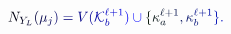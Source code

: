 \documentclass[12pt]{article}
\begin{document}
\makeatletter
\renewcommand*{\@textcolor}[3]{%
  \protect\leavevmode
  \begingroup
    \color#1{#2}#3%
  \endgroup
}
\makeatother
\begin{displaymath}
\mathcolor[RGB]{0,0,15}{N} _ { \mathcolor[RGB]{0,0,30}{Y} _ { \mathcolor[RGB]{0,0,45}{L} } } \mathcolor[RGB]{0,0,60}{(} \mathcolor[RGB]{0,0,75}{\mu} _ { \mathcolor[RGB]{0,0,90}{j} } \mathcolor[RGB]{0,0,105}{)} \mathcolor[RGB]{0,0,120}{=} \mathcolor[RGB]{0,0,135}{V} \mathcolor[RGB]{0,0,150}{(} \mathcal { \mathcolor[RGB]{0,0,165}{K} } _ { \mathcolor[RGB]{0,0,180}{b} } ^ { \mathcolor[RGB]{0,0,195}{\ell} \mathcolor[RGB]{0,0,210}{+} \mathcolor[RGB]{0,0,225}{1} } \mathcolor[RGB]{0,0,240}{)} \mathcolor[RGB]{0,0,255}{\cup} \mathcolor[RGB]{0,15,0}{\{} \mathcolor[RGB]{0,15,15}{\kappa} _ { \mathcolor[RGB]{0,15,30}{a} } ^ { \mathcolor[RGB]{0,15,45}{\ell} \mathcolor[RGB]{0,15,60}{+} \mathcolor[RGB]{0,15,75}{1} } \mathcolor[RGB]{0,15,90}{,} \mathcolor[RGB]{0,15,105}{\kappa} _ { \mathcolor[RGB]{0,15,120}{b} } ^ { \mathcolor[RGB]{0,15,135}{\ell} \mathcolor[RGB]{0,15,150}{+} \mathcolor[RGB]{0,15,165}{1} } \mathcolor[RGB]{0,15,180}{\}} \mathcolor[RGB]{0,15,195}{.}
\end{displaymath}
\end{document}
